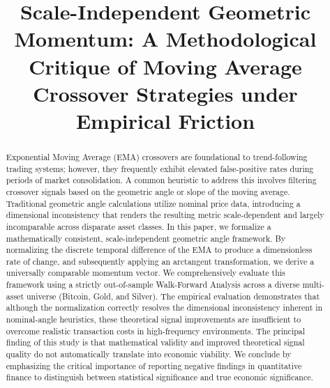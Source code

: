 \documentclass[conference]{IEEEtran}
\begin{document}
\title{Scale-Independent Geometric Momentum: A Methodological Critique of Moving Average Crossover Strategies under Empirical Friction}

\author{
\and
{}
\and
{}
}

\maketitle

\begin{abstract}
Exponential Moving Average (EMA) crossovers are foundational to trend-following trading systems; however, they frequently exhibit elevated false-positive rates during periods of market consolidation. A common heuristic to address this involves filtering crossover signals based on the geometric angle or slope of the moving average. Traditional geometric angle calculations utilize nominal price data, introducing a dimensional inconsistency that renders the resulting metric scale-dependent and largely incomparable across disparate asset classes. In this paper, we formalize a mathematically consistent, scale-independent geometric angle framework. By normalizing the discrete temporal difference of the EMA to produce a dimensionless rate of change, and subsequently applying an arctangent transformation, we derive a universally comparable momentum vector. We comprehensively evaluate this framework using a strictly out-of-sample Walk-Forward Analysis across a diverse multi-asset universe (Bitcoin, Gold, and Silver). The empirical evaluation demonstrates that although the normalization correctly resolves the dimensional inconsistency inherent in nominal-angle heuristics, these theoretical signal improvements are insufficient to overcome realistic transaction costs in high-frequency environments. The principal finding of this study is that mathematical validity and improved theoretical signal quality do not automatically translate into economic viability. We conclude by emphasizing the critical importance of reporting negative findings in quantitative finance to distinguish between statistical significance and true economic significance.
\end{abstract}
\end{document}
